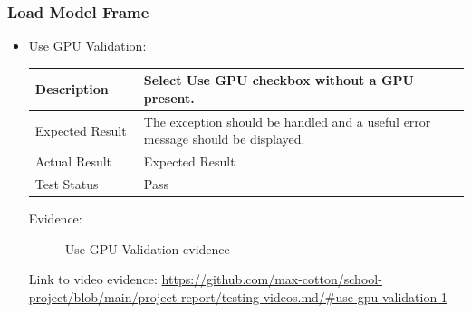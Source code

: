 \documentclass[./project-report/src/latex/project-report.tex]{subfiles}
\begin{document}
\pagebreak

\subsubsection{Load Model Frame}
\label{sec:load-model-frame-input-validation}
\begin{itemize}
	\item Use GPU Validation: \newline\newline
		\begin{tabular}{|p{0.25\linewidth}|p{0.75\linewidth}|}
			\hline
			Description & Select Use GPU checkbox without a GPU present. \\
			\hline
			Expected Result & The exception should be handled and a useful error message should be displayed. \\
			\hline
			Actual Result & Expected Result \\
			\hline
			Test Status & Pass \\
			\hline
		\end{tabular}
		
		\vspace{5mm}

		Evidence:
		\begin{figure}[h!]
		\centering
		\caption{Use GPU Validation evidence}
		\end{figure}

		Link to video evidence: \url{https://github.com/max-cotton/school-project/blob/main/project-report/testing-videos.md/#use-gpu-validation-1}
\end{itemize}
\end{document}
